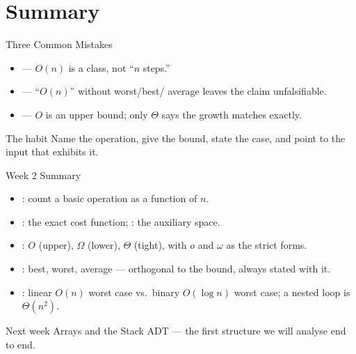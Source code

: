 \documentclass[aspectratio=169]{beamer}
\begin{document}
\section{Summary}

\begin{frame}{Three Common Mistakes}
  \begin{itemize}
    \item {} --- $O(n)$ is a class,
      not ``$n$ steps.''
    \item {} --- ``$O(n)$'' without worst/best/
      average leaves the claim unfalsifiable.
    \item {} --- $O$ is an upper bound; only $\Theta$
      says the growth matches exactly.
  \end{itemize}
  \begin{exampleblock}{The habit}
    Name the operation, give the bound, state the case, and point to the input
    that exhibits it.
  \end{exampleblock}
\end{frame}

\begin{frame}{Week 2 Summary}
  \begin{itemize}
    \item {}: count a basic operation as a function of $n$.
    \item {}: the exact cost function; : the auxiliary space.
    \item {}: $O$ (upper), $\Omega$ (lower), $\Theta$ (tight),
      with $o$ and $\omega$ as the strict forms.
    \item {}: best, worst, average --- orthogonal to the bound, always
      stated with it.
    \item {}: linear $O(n)$ worst case vs.\ binary $O(\log n)$
      worst case; a nested loop is $\Theta(n^2)$.
  \end{itemize}
  \vspace{0.15cm}
  \begin{exampleblock}{Next week}
    Arrays and the Stack ADT --- the first structure we will analyse end to end.
  \end{exampleblock}
\end{frame}
\end{document}
